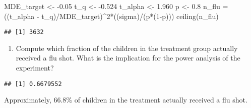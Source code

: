 \documentclass[
]{article}
\newenvironment{Shaded}{\begin{snugshade}}{\end{snugshade}}
\newcommand{\DecValTok}[1]{\textcolor[rgb]{0.00,0.00,0.81}{#1}}
\newcommand{\FloatTok}[1]{\textcolor[rgb]{0.00,0.00,0.81}{#1}}
\newcommand{\FunctionTok}[1]{\textcolor[rgb]{0.00,0.00,0.00}{#1}}
\newcommand{\NormalTok}[1]{#1}
\newcommand{\OtherTok}[1]{\textcolor[rgb]{0.56,0.35,0.01}{#1}}
\newcommand{\SpecialCharTok}[1]{\textcolor[rgb]{0.00,0.00,0.00}{#1}}
\newcommand{\StringTok}[1]{\textcolor[rgb]{0.31,0.60,0.02}{#1}}
\providecommand{\tightlist}{%
  \setlength{\itemsep}{0pt}\setlength{\parskip}{0pt}}
\begin{document}
\begin{Shaded}
\begin{Highlighting}[]
\NormalTok{MDE\_target }\OtherTok{\textless{}{-}} \SpecialCharTok{{-}}\FloatTok{0.05}
\NormalTok{t\_q }\OtherTok{\textless{}{-}} \SpecialCharTok{{-}}\FloatTok{0.524}
\NormalTok{t\_alpha }\OtherTok{\textless{}{-}} \FloatTok{1.960}
\NormalTok{p }\OtherTok{\textless{}{-}} \FloatTok{0.8}
\NormalTok{n\_flu }\OtherTok{=}\NormalTok{ ((t\_alpha }\SpecialCharTok{{-}}\NormalTok{ t\_q)}\SpecialCharTok{/}\NormalTok{MDE\_target)}\SpecialCharTok{\^{}}\DecValTok{2}\SpecialCharTok{*}\NormalTok{((sigma)}\SpecialCharTok{/}\NormalTok{(p}\SpecialCharTok{*}\NormalTok{(}\DecValTok{1}\SpecialCharTok{{-}}\NormalTok{p)))}
\FunctionTok{ceiling}\NormalTok{(n\_flu)}
\end{Highlighting}
\end{Shaded}

\begin{verbatim}
## [1] 3632
\end{verbatim}

\begin{enumerate}
\def\labelenumi{\alph{enumi})}
\setcounter{enumi}{1}
\tightlist
\item
  Compute which fraction of the children in the treatment group actually
  received a flu shot. What is the implication for the power analysis of
  the experiment?
\end{enumerate}

\begin{Shaded}
\end{Shaded}

\begin{verbatim}
## [1] 0.6679552
\end{verbatim}

Approximately, \(66.8\%\) of children in the treatment actually received
a flu shot.

\begin{Shaded}
\end{Shaded}
\end{document}
